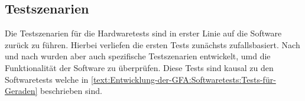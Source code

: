 \subsection{Testszenarien}

Die Testszenarien für die Hardwaretests sind in erster Linie auf die Software zurück zu führen. Hierbei verliefen die ersten Tests zunächsts zufallsbasiert. Nach und nach wurden aber auch spezifische Testszenarien entwickelt, umd die Funktionalität der Software zu überprüfen. Diese Tests sind kausal zu den Softwaretests welche in \autoref{text:Entwicklung-der-GFA:Softwaretests:Tests-für-Geraden}  beschrieben sind.
